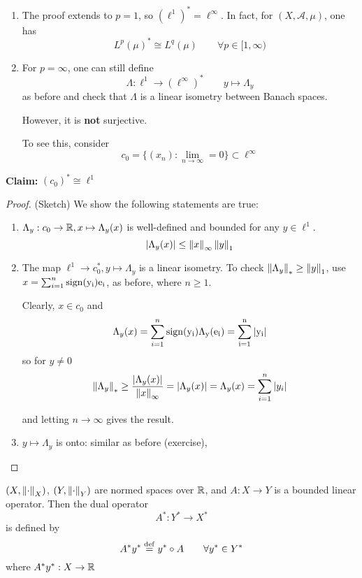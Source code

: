 \documentclass{article}
\begin{document}
\begin{remark}
	\begin{enumerate}[1)]
		\item The proof extends to  \(p=1\), so  \((\ell^1)^* = \ell^{\infty}\). In fact, for  \((X, \mathcal{A}, \mu)\), one has
		      \[L^p(\mu)^* \cong L^q(\mu) \qquad \forall p \in [1, \infty)\]
		\item For  \(p=\infty\), one can still define
		      \[\Lambda: \ell^1 \to (\ell^{\infty})^* \qquad y \mapsto \Lambda_y\]
		      as before and check that  \(\Lambda\) is a linear isometry between Banach spaces.

		      However, it is \textbf{not} surjective.

		      To see this, consider
		      \[c_0 = \{(x_n): \lim_{n \to \infty} = 0\} \subset \ell^{\infty}\]
	\end{enumerate}

	\textbf{Claim:} \((c_0)^* \cong \ell^1\ \)
	\begin{proof}
		(Sketch) We show the following statements are true:
		\begin{enumerate}[1)]
			\item \(\Lambda_y: c_0 \to \mathbb{R}, x \mapsto \Lambda_y(x)\) is well-defined and bounded for any
			      \(y \in \ell^1\).
			      \[|\Lambda_y(x)| \leq \left\|{x}\right\|_{\infty} \left\|{y}\right\|_1\]

			\item The map \( \ell^1 \to c_0^*, y \mapsto \Lambda_y\) is a linear isometry. To check
			      \(\left\|{\Lambda_y}\right\|_* \geq \left\|{y}\right\|_1\), use \(x = \sum_{i=1}^n \rm{sign}(y_i)e_i\), as before, where
			      \(n \geq 1\).

			      Clearly, \(x \in c_0\) and
			      \[\Lambda_y(x) = \sum_{i=1}^n \rm{sign}(y_i) \Lambda_y(e_i)=\sum_{i=1}^n |y_i|\]
			      so for \(y \neq 0\)
			      \[\left\|{\Lambda_y}\right\|_* \geq \frac{|\Lambda_y(x)|}{\left\|{x}\right\|_{\infty}}=|\Lambda_y(x)|=\Lambda_y(x)=\sum_{i=1}^n |y_i|\]

			      and letting \(n \to \infty\) gives the result.

			\item \(y \mapsto \Lambda_y\) is onto: similar as before (exercise),
		\end{enumerate}
	\end{proof}
\end{remark}

\begin{definition}
	\nl
	\((X, \left\|{\cdot}\right\|_X)\), \((Y, \left\|{\cdot}\right\|_Y)\) are normed spaces over \(\mathbb{R}\), and \(A: X \to Y\) is a bounded linear operator.
	Then the dual operator
	\[A^*: Y^* \to X^*\]
	is defined by
	\[A^* y^* \overset{\rm{def}}{=} y^* \circ A \qquad \forall y^* \in Y^* \]
	where \(A^* y^* : X \to \mathbb{R}\)
\end{definition}
\end{document}
